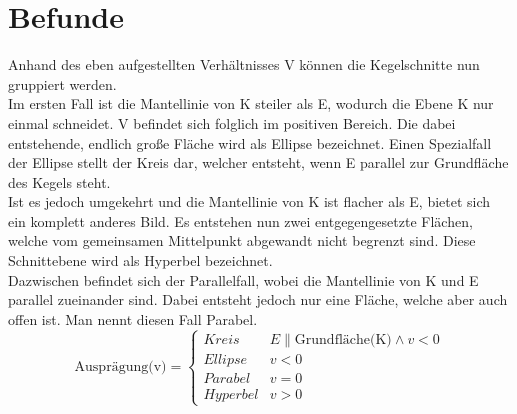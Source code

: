 \section{Befunde}
Anhand des eben aufgestellten Verhältnisses V können die Kegelschnitte nun gruppiert werden.\\
Im ersten Fall ist die Mantellinie von K steiler als E, wodurch die Ebene K nur  einmal schneidet. V befindet sich folglich im positiven Bereich. Die dabei entstehende, endlich große Fläche wird als Ellipse bezeichnet. Einen Spezialfall der Ellipse stellt der Kreis dar, welcher entsteht, wenn E parallel zur Grundfläche des Kegels steht.\\
Ist es jedoch umgekehrt und die Mantellinie von K ist flacher als E, bietet sich ein komplett anderes Bild. Es entstehen nun zwei entgegengesetzte Flächen, welche vom gemeinsamen Mittelpunkt abgewandt nicht begrenzt sind. Diese Schnittebene wird als Hyperbel bezeichnet.\\
Dazwischen befindet sich der Parallelfall, wobei die Mantellinie von K und E parallel zueinander sind. Dabei entsteht jedoch nur eine Fläche, welche aber auch offen ist. Man nennt diesen Fall Parabel.\\
\begin{displaymath}
   \text{Ausprägung(v)} = \left\{
     \begin{array}{lr}
       Kreis & E \parallel \text{Grundfläche(K)} \wedge v < 0 \\
       Ellipse & v < 0\\
       Parabel & v = 0\\
       Hyperbel & v > 0
     \end{array}
   \right.
\end{displaymath}